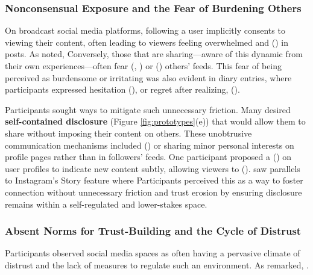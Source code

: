 \subsubsection{Nonconsensual Exposure and the Fear of Burdening Others}
\label{section:4-3-3}
On broadcast social media platforms, following a user implicitly consents to viewing their content, often leading to viewers feeling overwhelmed and  () in posts. As  noted,  Conversely, those that are sharing---aware of this dynamic from their own experiences---often fear  (, ) or  () others' feeds. This fear of being perceived as burdensome or irritating was also evident in diary entries, where participants expressed hesitation  (), or regret after realizing,  ().

Participants sought ways to mitigate such unnecessary friction. Many desired \textbf{self-contained disclosure} (Figure \ref{fig:prototypes}(e)) that would allow them to share without imposing their content on others. These unobtrusive communication mechanisms included  () or sharing minor personal interests on profile pages rather than in followers' feeds. One participant proposed a  () on user profiles to indicate new content subtly, allowing viewers to  ().  saw parallels to Instagram's Story feature where  Participants perceived this as a way to foster connection without unnecessary friction and trust erosion by ensuring disclosure remains within a self-regulated and lower-stakes space.



\subsubsection{Absent Norms for Trust-Building and the Cycle of Distrust}
\label{section:4-3-4}
Participants observed social media spaces as often having a pervasive climate of distrust and the lack of measures to regulate such an environment. As  remarked, . 

